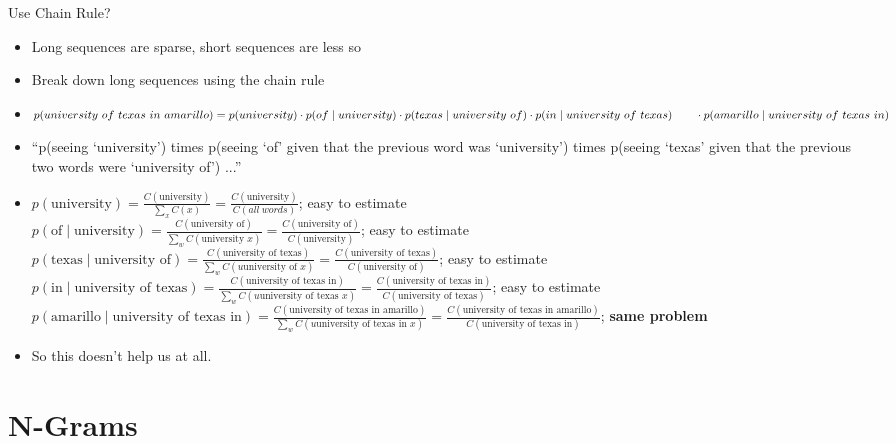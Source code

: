 \documentclass[11pt,letterpaper]{article}
\begin{document}
Use Chain Rule?

\begin{itemize}
  \item Long sequences are sparse, short sequences are less so
  \item Break down long sequences using the chain rule
  \item $p(university~of~texas~in~amarillo) = \\
         p(university) \cdot 
         p(of \mid university) \cdot 
         p(texas \mid university~of) \cdot 
         p(in \mid university~of~texas) \\
  ~~~~~~ \cdot p(amarillo \mid university~of~texas~in)$
  \item ``p(seeing `university') times p(seeing `of' given that the previous word was `university') times p(seeing `texas' given that the previous two words were `university of') ...''
  \item 
     $p(\text{university}) = 
     \frac{C(\text{university})}{\sum_x C(x)} = 
     \frac{C(\text{university})}{C(all~words)}$; easy to estimate
  \\ $p(\text{of} \mid \text{university}) = 
     \frac{C(\text{university of})}{\sum_w C(\text{university } x)} = 
     \frac{C(\text{university of})}{C(\text{university})}$; easy to estimate
  \\ $p(\text{texas} \mid \text{university of}) = 
     \frac{C(\text{university of texas})}{\sum_w C(u\text{university of } x)} = 
     \frac{C(\text{university of texas})}{C(\text{university of})}$; easy to estimate
  \\ $p(\text{in} \mid \text{university of texas}) = 
     \frac{C(\text{university of texas in})}{\sum_w C(u\text{university of texas } x)} = 
     \frac{C(\text{university of texas in})}{C(\text{university of texas})}$; easy to estimate
  \\ $p(\text{amarillo} \mid \text{university of texas in}) = 
     \frac{C(\text{university of texas in amarillo})}{\sum_w C(u\text{university of texas in } x)} = 
     \frac{C(\text{university of texas in amarillo})}{C(\text{university of texas in})}$; \textbf{same problem}
  \item So this doesn't help us at all.
\end{itemize}


\section{N-Grams}
\end{document}
